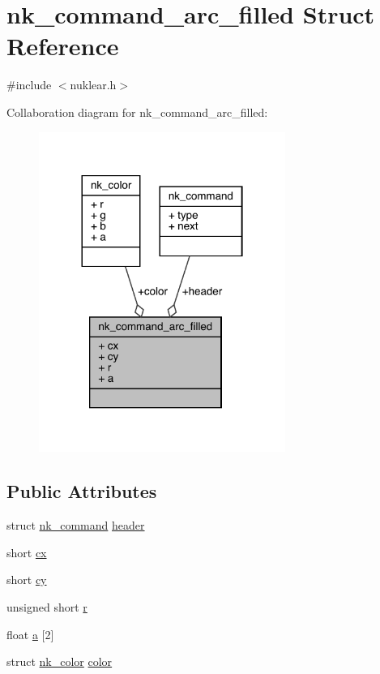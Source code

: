 \hypertarget{structnk__command__arc__filled}{}\section{nk\+\_\+command\+\_\+arc\+\_\+filled Struct Reference}
\label{structnk__command__arc__filled}


{\ttfamily \#include $<$nuklear.\+h$>$}



Collaboration diagram for nk\+\_\+command\+\_\+arc\+\_\+filled\+:
\nopagebreak
\begin{figure}[H]
\begin{center}
\leavevmode
\includegraphics[width=228pt]{structnk__command__arc__filled__coll__graph}
\end{center}
\end{figure}
\subsection*{Public Attributes}
\begin{DoxyCompactItemize}
\item 
struct \mbox{\hyperlink{structnk__command}{nk\+\_\+command}} \mbox{\hyperlink{structnk__command__arc__filled_a5dab5721944b118c5baae25ab8654ecb}{header}}
\item 
short \mbox{\hyperlink{structnk__command__arc__filled_aa460de8a71d839c0b07272e73d3cadf4}{cx}}
\item 
short \mbox{\hyperlink{structnk__command__arc__filled_a256160e8fe2a191ce9932e83f6cb2b07}{cy}}
\item 
unsigned short \mbox{\hyperlink{structnk__command__arc__filled_a31784cc181f33422ea8b09bc01463937}{r}}
\item 
float \mbox{\hyperlink{structnk__command__arc__filled_aeffc48c9cae2eec6e3bc4835ef330377}{a}} \mbox{[}2\mbox{]}
\item 
struct \mbox{\hyperlink{structnk__color}{nk\+\_\+color}} \mbox{\hyperlink{structnk__command__arc__filled_adcc1cdd72808838ae02c4b552c4f3229}{color}}
\end{DoxyCompactItemize}



